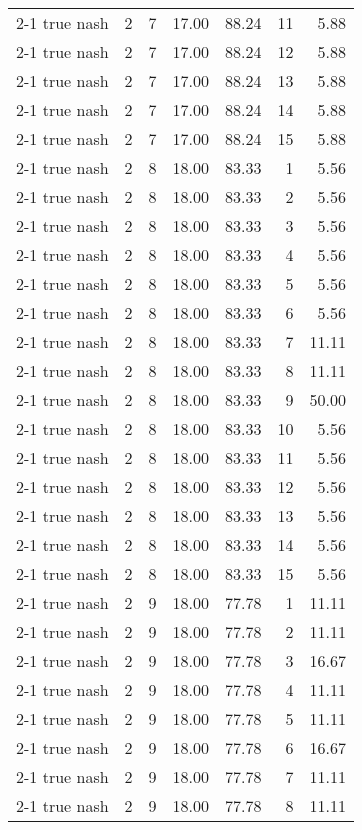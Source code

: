 \begin{tabular}{lrrrrrr}
2-1  true nash & 2 & 7 & 17.00 & 88.24 & 11 & 5.88 \\
2-1  true nash & 2 & 7 & 17.00 & 88.24 & 12 & 5.88 \\
2-1  true nash & 2 & 7 & 17.00 & 88.24 & 13 & 5.88 \\
2-1  true nash & 2 & 7 & 17.00 & 88.24 & 14 & 5.88 \\
2-1  true nash & 2 & 7 & 17.00 & 88.24 & 15 & 5.88 \\
2-1  true nash & 2 & 8 & 18.00 & 83.33 & 1 & 5.56 \\
2-1  true nash & 2 & 8 & 18.00 & 83.33 & 2 & 5.56 \\
2-1  true nash & 2 & 8 & 18.00 & 83.33 & 3 & 5.56 \\
2-1  true nash & 2 & 8 & 18.00 & 83.33 & 4 & 5.56 \\
2-1  true nash & 2 & 8 & 18.00 & 83.33 & 5 & 5.56 \\
2-1  true nash & 2 & 8 & 18.00 & 83.33 & 6 & 5.56 \\
2-1  true nash & 2 & 8 & 18.00 & 83.33 & 7 & 11.11 \\
2-1  true nash & 2 & 8 & 18.00 & 83.33 & 8 & 11.11 \\
2-1  true nash & 2 & 8 & 18.00 & 83.33 & 9 & 50.00 \\
2-1  true nash & 2 & 8 & 18.00 & 83.33 & 10 & 5.56 \\
2-1  true nash & 2 & 8 & 18.00 & 83.33 & 11 & 5.56 \\
2-1  true nash & 2 & 8 & 18.00 & 83.33 & 12 & 5.56 \\
2-1  true nash & 2 & 8 & 18.00 & 83.33 & 13 & 5.56 \\
2-1  true nash & 2 & 8 & 18.00 & 83.33 & 14 & 5.56 \\
2-1  true nash & 2 & 8 & 18.00 & 83.33 & 15 & 5.56 \\
2-1  true nash & 2 & 9 & 18.00 & 77.78 & 1 & 11.11 \\
2-1  true nash & 2 & 9 & 18.00 & 77.78 & 2 & 11.11 \\
2-1  true nash & 2 & 9 & 18.00 & 77.78 & 3 & 16.67 \\
2-1  true nash & 2 & 9 & 18.00 & 77.78 & 4 & 11.11 \\
2-1  true nash & 2 & 9 & 18.00 & 77.78 & 5 & 11.11 \\
2-1  true nash & 2 & 9 & 18.00 & 77.78 & 6 & 16.67 \\
2-1  true nash & 2 & 9 & 18.00 & 77.78 & 7 & 11.11 \\
2-1  true nash & 2 & 9 & 18.00 & 77.78 & 8 & 11.11 \\

\end{tabular}
